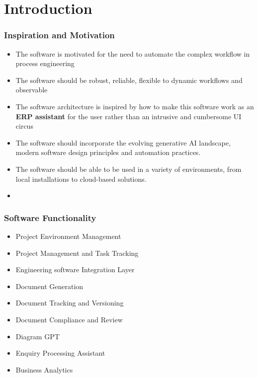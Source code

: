 \section{Introduction}
\begin{frame}
  \frametitle{Inspiration and Motivation}
  \begin{itemize}
    \item The software is motivated for the need to automate the complex workflow in process engineering
    \item The software should be robust, reliable, flexible to dynamic workflows and observable 
    \item The software architecture is inspired by how to make this software work as an \textbf{ERP assistant} for the user rather than an intrusive and cumbersome UI circus 
    \item The software should incorporate the evolving generative AI landscape, modern software design principles and automation practices.
    \item The software should be able to be used in a variety of environments, from local installations to cloud-based solutions. 
    \item 
  \end{itemize}
\end{frame}
\begin{frame}
    \frametitle{Software Functionality}
    \begin{itemize}
        \item Project Environment Management
        \item Project Management and Task Tracking
        \item Engineering software Integration Layer
        \item Document Generation
        \item Document Tracking and Versioning
        \item Document Compliance and Review
        \item Diagram GPT
        \item Enquiry Processing Assistant
        \item Business Analytics
    \end{itemize}
\end{frame}

